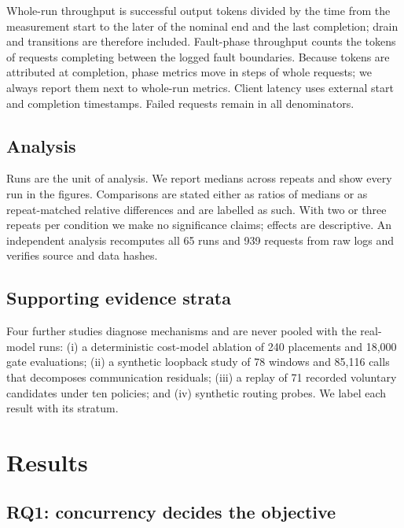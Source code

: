 \documentclass[preprint,12pt]{elsarticle}
\begin{document}
Whole-run throughput is successful output tokens divided by the time
from the measurement start to the later of the nominal end and the last
completion; drain and transitions are therefore included. Fault-phase
throughput counts the tokens of requests completing between the logged
fault boundaries. Because tokens are attributed at completion, phase
metrics move in steps of whole requests; we always report them next to
whole-run metrics. Client latency uses external start and completion
timestamps. Failed requests remain in all denominators.

\hypertarget{analysis}{%
\subsection{Analysis}\label{analysis}}

Runs are the unit of analysis. We report medians across repeats and show
every run in the figures. Comparisons are stated either as ratios of
medians or as repeat-matched relative differences and are labelled as
such. With two or three repeats per condition we make no significance
claims; effects are descriptive. An independent analysis recomputes all
65 runs and 939 requests from raw logs and verifies source and data
hashes.

\hypertarget{supporting-evidence-strata}{%
\subsection{Supporting evidence
strata}\label{supporting-evidence-strata}}

Four further studies diagnose mechanisms and are never pooled with the
real-model runs: (i) a deterministic cost-model ablation of 240
placements and 18,000 gate evaluations; (ii) a synthetic loopback study
of 78 windows and 85,116 calls that decomposes communication residuals;
(iii) a replay of 71 recorded voluntary candidates under ten policies;
and (iv) synthetic routing probes. We label each result with its
stratum.

\hypertarget{results}{%
\section{Results}\label{results}}

\hypertarget{rq1-concurrency-decides-the-objective}{%
\subsection{RQ1: concurrency decides the
objective}\label{rq1-concurrency-decides-the-objective}}
\end{document}
